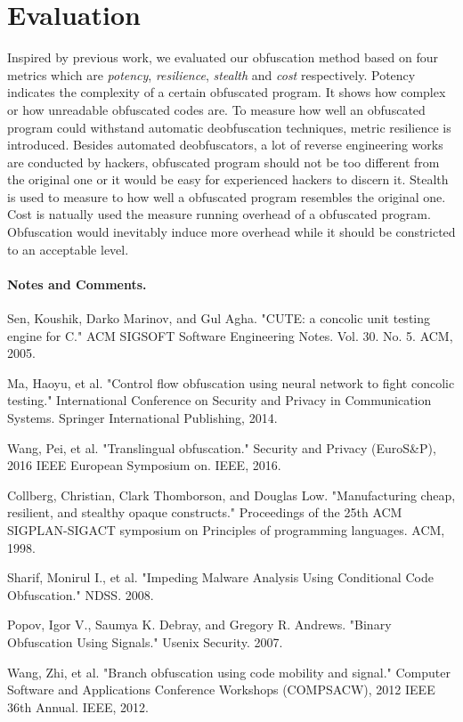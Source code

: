 \documentclass[lnicst]{svmultln}
\begin{document}
\section{Evaluation}
Inspired by previous work\cite{Collberg}, we evaluated our obfuscation method based on four metrics which are \textit{potency}, \textit{resilience}, \textit{stealth} and \textit{cost} respectively. Potency indicates the complexity of a certain obfuscated program. It shows how complex or how unreadable obfuscated codes are. To measure how well an obfuscated program could withstand automatic deobfuscation techniques, metric resilience is introduced. Besides automated deobfuscators, a lot of reverse engineering works are conducted by hackers, obfuscated program should not be too different from the original one or it would be easy for experienced hackers to discern it. Stealth is used to measure to how well a obfuscated program resembles the original one. Cost is natually used the measure running overhead of a obfuscated program. Obfuscation would inevitably induce more overhead while it should be constricted to an acceptable level.

%




\paragraph{Notes and Comments.}

%
%
\begin{thebibliography}{5}

 Sen, Koushik, Darko Marinov, and Gul Agha. "CUTE: a concolic unit testing engine for C." ACM SIGSOFT Software Engineering Notes. Vol. 30. No. 5. ACM, 2005.

 Ma, Haoyu, et al. "Control flow obfuscation using neural network to fight concolic testing." International Conference on Security and Privacy in Communication Systems. Springer International Publishing, 2014.

 Wang, Pei, et al. "Translingual obfuscation." Security and Privacy (EuroS\&P), 2016 IEEE European Symposium on. IEEE, 2016.

 Collberg, Christian, Clark Thomborson, and Douglas Low. "Manufacturing cheap, resilient, and stealthy opaque constructs." Proceedings of the 25th ACM SIGPLAN-SIGACT symposium on Principles of programming languages. ACM, 1998.

 Sharif, Monirul I., et al. "Impeding Malware Analysis Using Conditional Code Obfuscation." NDSS. 2008.

 Popov, Igor V., Saumya K. Debray, and Gregory R. Andrews. "Binary Obfuscation Using Signals." Usenix Security. 2007.

 Wang, Zhi, et al. "Branch obfuscation using code mobility and signal." Computer Software and Applications Conference Workshops (COMPSACW), 2012 IEEE 36th Annual. IEEE, 2012.



\end{thebibliography}
%
\end{document}
